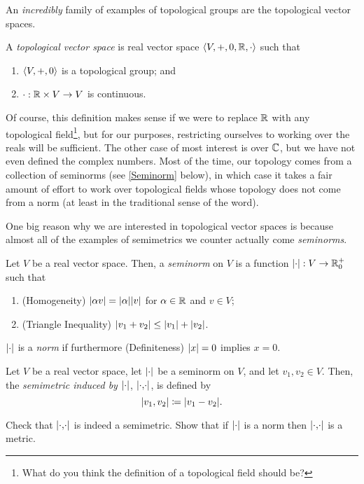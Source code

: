 An \emph{incredibly} family of examples of topological groups are the topological vector spaces.
\begin{dfn}
A \emph{topological vector space} is real vector space $\langle V,+,0,\mathbb{R} ,\cdot\rangle$ such that
\begin{enumerate}
\item $\langle V,+,0\rangle$ is a topological group; and
\item $\cdot :\mathbb{R} \times V\rightarrow V$ is continuous.
\end{enumerate}
\begin{rmk}
Of course, this definition makes sense if we were to replace $\mathbb{R}$ with any topological field\footnote{What do you think the definition of a topological field should be?}, but for our purposes, restricting ourselves to working over the reals will be sufficient.  The other case of most interest is over $\mathbb{C}$, but we have not even defined the complex numbers.  Most of the time, our topology comes from a collection of seminorms (see \cref{Seminorm} below), in which case it takes a fair amount of effort to work over topological fields whose topology does not come from a norm (at least in the traditional sense of the word).
\end{rmk}
\end{dfn}
One big reason why we are interested in topological vector spaces is because almost all of the examples of semimetrics we counter actually come \emph{seminorms}.
\begin{dfn}\label{Seminorm}
Let $V$ be a real vector space.  Then, a \emph{seminorm} on $V$ is a function $\norm :V\rightarrow \R _0^+$ such that
\begin{enumerate}
\item (Homogeneity) $\norm[\alpha v]=\norm[\alpha ]\norm[v]$ for $\alpha \in \mathbb{R}$ and $v\in V$;
\item (Triangle Inequality) $\norm[v_1+v_2]\leq \norm[v_1]+\norm[v_2]$.
\end{enumerate}
$\norm$ is a \emph{norm} if furthermore (Definiteness) $\norm[x]=0$ implies $x=0$.
\end{dfn}
\begin{dfn}
Let $V$ be a real vector space, let $\norm$ be a seminorm on $V$, and let $v_1,v_2\in V$.  Then, the \emph{semimetric induced by $\norm$}, $\metric$, is defined by
\begin{equation}
\metric[v_1][v_2]\coloneqq \norm[v_1-v_2].
\end{equation}
\begin{exr}
Check that $\metric$ is indeed a semimetric.  Show that if $\norm$ is a norm then $\metric$ is a metric.
\end{exr}
\end{dfn}
